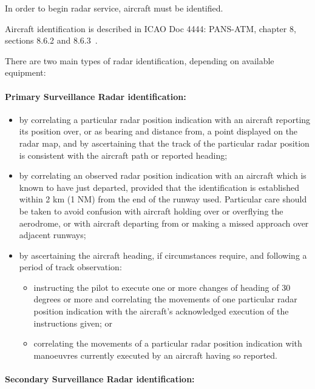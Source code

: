 In order to begin radar service, aircraft must be identified.

Aircraft identification is described in ICAO Doc 4444: PANS-ATM, chapter 8,
sections 8.6.2 and 8.6.3~\cite{4444}.

There are two main types of radar identification, depending on available
equipment:

\paragraph{Primary Surveillance Radar identification:} \cite[sect.
8.6.2.4]{4444}

\begin{itemize}
\item by correlating a particular radar position indication with an aircraft
reporting its position over, or as bearing and distance from, a point displayed
on the radar map, and by ascertaining that the track of the particular radar
position is consistent with the aircraft path or reported heading;
\item by correlating an observed radar position indication with an aircraft
which is known to have just departed, provided that the identification is
established within 2 km (1 NM) from the end of the runway used. Particular care
should be taken to avoid confusion with aircraft holding over or overflying the
aerodrome, or with aircraft departing from or making a missed approach over
adjacent runways;
\item by ascertaining the aircraft heading, if circumstances require, and
following a period of track observation:
  \begin{itemize}
  \item instructing the pilot to execute one or more changes of heading of 30
degrees or more and correlating the movements of one particular radar position
indication with the aircraft's acknowledged execution of the instructions given;
or
  \item correlating the movements of a particular radar position indication with
manoeuvres currently executed by an aircraft having so reported.
  \end{itemize}
\end{itemize}

\paragraph{Secondary Surveillance Radar identification:} \cite[sect.
8.6.2.3]{4444}

